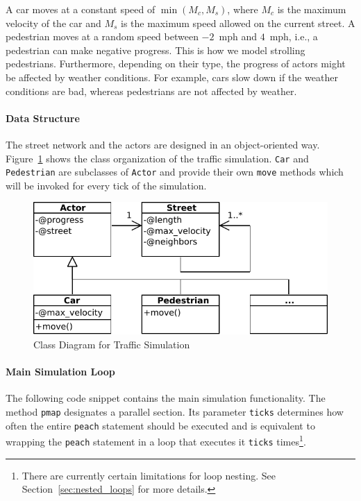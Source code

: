 \documentclass[preprint]{sigplanconf}
\begin{document}
A car moves at a constant speed of $\min(M_c, M_s)$, where $M_c$ is the maximum velocity of the car and $M_s$ is the maximum speed allowed on the current street. A pedestrian moves at a random speed between $-2$~mph and $4$~mph, i.e., a pedestrian can make negative progress. This is how we model strolling pedestrians. Furthermore, depending on their type, the progress of actors might be affected by weather conditions. For example, cars slow down if the weather conditions are bad, whereas pedestrians are not affected by weather.

\paragraph{Data Structure}
The street network and the actors are designed in an object-oriented way. Figure~\ref{fig:running_example_classes} shows the class organization of the traffic simulation. \texttt{Car} and \texttt{Pedestrian} are subclasses of \texttt{Actor} and provide their own \texttt{move} methods which will be invoked for every tick of the simulation. 

\begin{figure}[!htp]
    \centering
    \includegraphics[width=0.8\columnwidth]{class_diagram_running_ex.pdf}
    \caption{Class Diagram for Traffic Simulation}
    \label{fig:running_example_classes}
\end{figure}

\paragraph{Main Simulation Loop}
The following code snippet contains the main simulation functionality. The method \texttt{pmap} designates a parallel section. Its parameter \texttt{ticks} determines how often the entire \texttt{peach} statement should be executed and is equivalent to wrapping the \texttt{peach} statement in a loop that executes it \texttt{ticks} times\footnote{There are currently certain limitations for loop nesting. See Section~\ref{sec:nested_loops} for more details.}.
\end{document}
